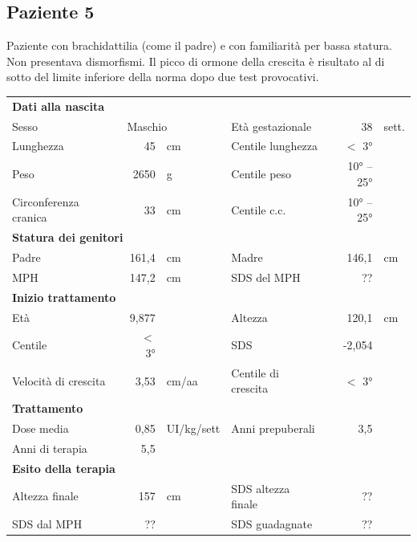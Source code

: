 \subsection*{Paziente 5}%

Paziente con brachidattilia (come il padre) e con familiarità per bassa statura. Non presentava dismorfismi. Il picco di ormone della crescita è risultato al di sotto del limite inferiore della norma dopo due test provocativi.

\begin{table}[!h]
\begin{tabular}{lrllrl}
\toprule
\multicolumn{6}{l}{\textbf{Dati alla nascita}}\\
Sesso 		& \multicolumn{2}{l}{Maschio} 	& Età gestazionale 		& 38 		& sett.\\
Lunghezza 	& 45 		& cm 				& Centile lunghezza		& $<$ 3° 		\\
Peso 		& 2650 		& g					& Centile peso			& 10° -- 25° 		\\
Circonferenza cranica	& 33 		& cm 	& Centile c.c.			& 10° -- 25° \\
\midrule
\multicolumn{6}{l}{\textbf{Statura dei genitori}}\\
Padre 		& 161,4 & cm 	& Madre 				& 146,1 & cm \\
MPH 		& 147,2 & cm 	& SDS del MPH 			& ??\\
\midrule
\multicolumn{6}{l}{\textbf{Inizio trattamento}} \\
Età	& 9,877 & 		& Altezza 				& 120,1 & cm  \\
Centile & $<$ 3° 	 &		& SDS		& -2,054 \\
Velocità di crescita & 3,53 & cm/aa	& Centile di crescita & $<$ 3°\\
\midrule
\multicolumn{6}{l}{\textbf{Trattamento}} \\
Dose media		& 0,85 & UI/kg/sett & Anni prepuberali & 3,5\\
Anni di terapia & 5,5\\
\midrule
\multicolumn{6}{l}{\textbf{Esito della terapia}} \\
Altezza finale			& 157 & cm 	& SDS altezza finale		& ??\\
SDS dal MPH				& ?? &		& SDS guadagnate 			& ??\\
\bottomrule
\end{tabular}
\end{table}
\clearpage

